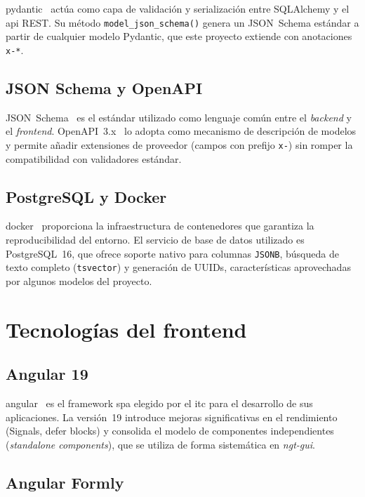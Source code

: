 \gls{pydantic}~\cite{pydantic} actúa como capa de validación y serialización entre
SQLAlchemy y el \gls{api} REST. Su método \texttt{model\_json\_schema()} genera un
JSON~Schema estándar a partir de cualquier modelo Pydantic, que este proyecto extiende con
anotaciones \texttt{x-*}.

\subsection{JSON Schema y OpenAPI}
\label{subsec:jsonschema}

JSON~Schema~\cite{jsonschema} es el estándar utilizado como lenguaje común entre el
\textit{backend} y el \textit{frontend}. OpenAPI~3.x~\cite{openapi} lo adopta como
mecanismo de descripción de modelos y permite añadir extensiones de proveedor (campos con
prefijo \texttt{x-}) sin romper la compatibilidad con validadores estándar.

\subsection{PostgreSQL y Docker}
\label{subsec:postgres-docker}

\gls{docker}~\cite{docker} proporciona la infraestructura de contenedores que garantiza la
reproducibilidad del entorno. El servicio de base de datos utilizado es PostgreSQL~16, que
ofrece soporte nativo para columnas \texttt{JSONB}, búsqueda de texto completo
(\texttt{tsvector}) y generación de UUIDs, características aprovechadas por algunos modelos
del proyecto.

\section{Tecnologías del frontend}
\label{sec:tecnologias-frontend}

\subsection{Angular 19}
\label{subsec:angular}

\gls{angular}~\cite{angular} es el framework \gls{spa} elegido por el \gls{itc} para el
desarrollo de sus aplicaciones. La versión~19 introduce mejoras significativas en el
rendimiento (Signals, defer blocks) y consolida el modelo de componentes independientes
(\textit{standalone components}), que se utiliza de forma sistemática en \textit{ngt-gui}.

\subsection{Angular Formly}
\label{subsec:formly}

